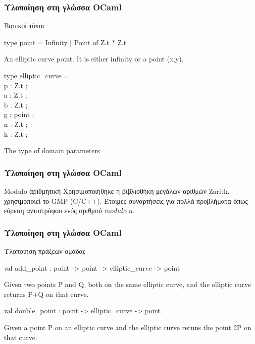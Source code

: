 \documentclass{beamer}
\begin{document}
%
\begin{frame}
\frametitle{Υλοποίηση στη γλώσσα OCaml}
\begin{block}
{Βασικοί τύποι}
\label{type:Ecc.Ecc.point}\begin{ocamldoccode}
type point =
   Infinity
  | Point of Z.t * Z.t
\end{ocamldoccode}
\begin{ocamldocdescription}
An elliptic curve point. It is either infinity or a point (x,y).
\end{ocamldocdescription}


\label{type:Ecc.Ecc.elliptic-underscorecurve}\begin{ocamldoccode}
type elliptic\_curve = {}\\
  p : Z.t ;\\
  a : Z.t ;\\
  b : Z.t ;\\
  g : point ;\\
  n : Z.t ;\\
  h : Z.t ;\\
{}
\end{ocamldoccode}
\begin{ocamldocdescription}
The type of domain parameters
\end{ocamldocdescription}
\end{block}
\end{frame}

%
\begin{frame}
\frametitle{Υλοποίηση στη γλώσσα OCaml}
\begin{block}
{Modulo αριθμητική}
Χρησιμοποιήθηκε η βιβλιοθήκη μεγάλων αριθμών Zarith, χρησιμοποιεί το GMP (C/C++). Έτοιμες συναρτήσεις για πολλά προβλήματα όπως εύρεση αντιστρόφου ενός αριθμού $modulo \; n$. 
\end{block}
\end{frame}

%
\begin{frame}
\frametitle{Υλοποίηση στη γλώσσα OCaml}
\begin{block}
{Υλοποίηση πράξεων ομάδας}
\label{val:Ecc.Ecc.add-underscorepoint}\begin{ocamldoccode}
val add\_point : point -> point -> elliptic\_curve -> point
\end{ocamldoccode}
\begin{ocamldocdescription}
Given two points P and Q, both on the same elliptic curve, and the elliptic curve returns P+Q on that curve.
\end{ocamldocdescription}
\label{val:Ecc.Ecc.double-underscorepoint}\begin{ocamldoccode}
val double\_point : point -> elliptic\_curve -> point
\end{ocamldoccode}
\begin{ocamldocdescription}
Given a point P on an elliptic curve and the elliptic curve retuns the point 2P on that curve.
\end{ocamldocdescription}
\end{block}
\end{frame}
\end{document}
